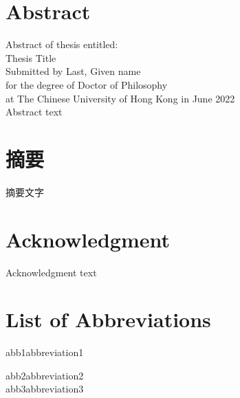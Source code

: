 \pagestyle{plain}


\clearpage
{} %
\section*{Abstract}
Abstract of thesis entitled:\\
Thesis Title\\
Submitted by Last, Given name\\
for the degree of Doctor of Philosophy\\
at The Chinese University of Hong Kong in June 2022\\

Abstract text %


\clearpage
{}
{}
\section*{摘要}
摘要文字 %


\clearpage
{}
{}
\section*{Acknowledgment}
Acknowledgment text %


\clearpage
{}
{}
\tableofcontents


\clearpage
{}
{}
\listoftables


\clearpage
{}
{}
\listoffigures


\clearpage
{}
{}
\section*{List of Abbreviations}
abb1\tabto{8em}abbreviation1

abb2\tabto{8em}abbreviation2\\
abb3\tabto{8em}abbreviation3\\
